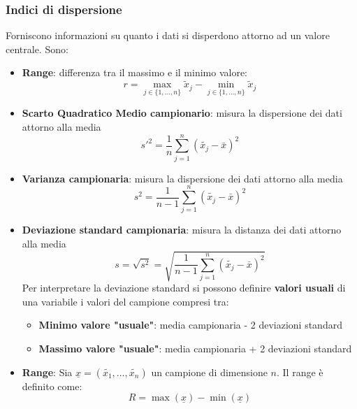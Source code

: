 \documentclass[a4paper]{article}
\theoremstyle{break}
\theoremstyle{break}
\theoremstyle{break}
\theoremstyle{break}
\begin{document}
\subsubsection{Indici di dispersione}
Forniscono informazioni su quanto i dati si disperdono attorno ad un valore centrale. Sono:
\begin{itemize}
  \item \textbf{Range}: differenza tra il massimo e il minimo valore:
    \[
      r = \underset{j \in \{1, \ldots, n\} }{\max} \tilde{x}_j - \underset{j \in \{1, \ldots, n\} }{\min} \tilde{x}_j
    \] 
	\item \textbf{Scarto Quadratico Medio campionario}: misura la dispersione dei dati attorno alla media
	      \[
		      s'^2 = \frac{1}{n} \sum_{j=1}^{n} (\tilde{x_j} - \bar{x})^2
	      \]
	\item \textbf{Varianza campionaria}: misura la dispersione dei dati attorno alla media
	      \[
		      s^2 = \frac{1}{n-1} \sum_{j=1}^{n} (\tilde{x_j} - \bar{x})^2
	      \]
	\item \textbf{Deviazione standard campionaria}: misura la distanza dei dati attorno alla media
	      \[
		      s = \sqrt{s^2} = \sqrt{\frac{1}{n-1} \sum_{j=1}^{n} (\tilde{x_j} - \bar{x})^2}
	      \]
        Per interpretare la deviazione standard si possono definire 
        \textbf{valori usuali} di una variabile i valori del campione compresi tra:
        \begin{itemize}
          \item \textbf{Minimo valore "usuale"}: media campionaria - 2 deviazioni standard
          \item \textbf{Massimo valore "usuale"}: media campionaria + 2 deviazioni standard
        \end{itemize}

	\item \textbf{Range}: Sia \( \underline{x} = (\tilde{x_1}, \ldots, \tilde{x_n}) \) un campione
	      di dimensione \( n \). Il range è definito come:
	      \[
		      R = \max(\underline{x}) - \min(\underline{x})
	      \]
\end{itemize}
\end{document}
